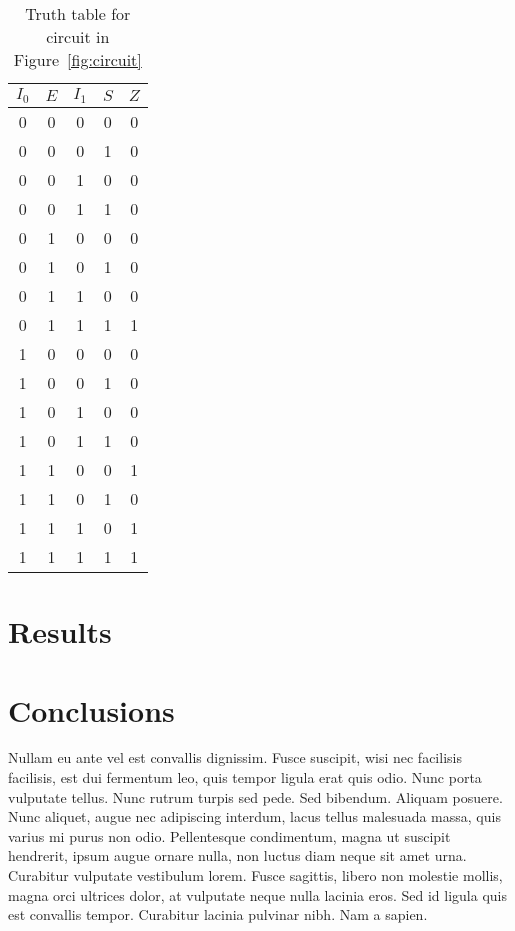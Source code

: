 \documentclass{article}
\begin{document}
\begin{table}[h]
  \label{tab:truth}
  \centering
  \begin{tabular}{cccc|c}
    $I_0$ & $E$ & $I_1$ & $S$ & $Z$ \\
    \hline
    0 & 0 & 0 & 0 & 0 \\
    0 & 0 & 0 & 1 & 0 \\
    0 & 0 & 1 & 0 & 0 \\
    0 & 0 & 1 & 1 & 0 \\
    0 & 1 & 0 & 0 & 0 \\
    0 & 1 & 0 & 1 & 0 \\
    0 & 1 & 1 & 0 & 0 \\
    0 & 1 & 1 & 1 & 1 \\
    1 & 0 & 0 & 0 & 0 \\
    1 & 0 & 0 & 1 & 0 \\
    1 & 0 & 1 & 0 & 0 \\
    1 & 0 & 1 & 1 & 0 \\
    1 & 1 & 0 & 0 & 1 \\
    1 & 1 & 0 & 1 & 0 \\
    1 & 1 & 1 & 0 & 1 \\
    1 & 1 & 1 & 1 & 1 \\
  \end{tabular}
  \caption{Truth table for circuit in Figure~\ref{fig:circuit}}
\end{table}

\section{Results}
\label{sec:results}

\section{Conclusions}
\label{sec:conclusion}

Nullam eu ante vel est convallis dignissim. Fusce suscipit, wisi nec
facilisis facilisis, est dui fermentum leo, quis tempor ligula erat
quis odio. Nunc porta vulputate tellus. Nunc rutrum turpis sed
pede. Sed bibendum. Aliquam posuere. Nunc aliquet, augue nec
adipiscing interdum, lacus tellus malesuada massa, quis varius mi
purus non odio. Pellentesque condimentum, magna ut suscipit hendrerit,
ipsum augue ornare nulla, non luctus diam neque sit amet
urna. Curabitur vulputate vestibulum lorem. Fusce sagittis, libero non
molestie mollis, magna orci ultrices dolor, at vulputate neque nulla
lacinia eros. Sed id ligula quis est convallis tempor. Curabitur
lacinia pulvinar nibh. Nam a sapien.
\end{document}
